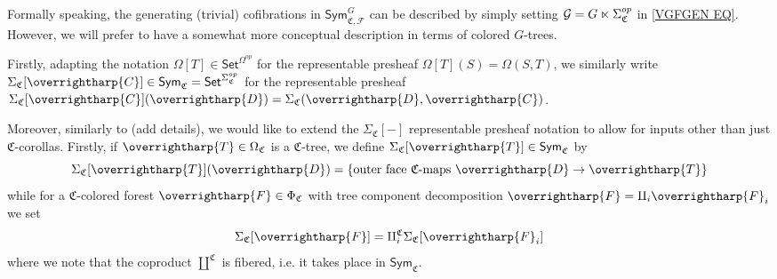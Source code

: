 \documentclass[a4paper,10pt
,draft
]{article}%
\renewcommand{\1}{\eta}%
\newcommand{\vect}[1]{\text{\overrightharp{\ensuremath{#1}}}}
\begin{document}
Formally speaking, the generating (trivial) cofibrations in 
$\mathsf{Sym}^G_{\mathfrak{C},\mathcal{F}}$
can be described by simply setting 
$\mathcal{G} = G \ltimes \Sigma^{op}_{\mathfrak{C}}$ in \eqref{VGFGEN EQ}.
However, we will prefer to have a somewhat more conceptual description in terms of colored $G$-trees.

Firstly, adapting the notation 
$\Omega[T] \in \mathsf{Set}^{\Omega^{op}}$
for the representable presheaf $\Omega[T](S) = \Omega(S,T)$,
we similarly write
$\Sigma_{\mathfrak{C}}[\vect{C}] 
\in \mathsf{Sym}_{\mathfrak{C}} = \mathsf{Set}^{\Sigma_{\mathfrak{C}}^{op}}$ for the representable presheaf
$\Sigma_{\mathfrak{C}}[\vect{C}](\vect{D})
= \Sigma_{\mathfrak{C}}(\vect{D},\vect{C})$.

Moreover, similarly to {\color{blue} \cite{BP_edss} (add details)},
we would like to extend the
$\Sigma_{\mathfrak{C}}[-]$ representable presheaf notation
to allow for inputs other than just $\mathfrak{C}$-corollas.
Firstly, if $\vect{T} \in \Omega_{\mathfrak{C}}$ is a $\mathfrak{C}$-tree, we define 
$\Sigma_{\mathfrak{C}}[\vect{T}] \in \mathsf{Sym}_{\mathfrak{C}}$
by
\[
\Sigma_{\mathfrak{C}}[\vect{T}](\vect{D})
=\{ \text{outer face $\mathfrak{C}$-maps } \vect{D} \to \vect{T}\}
\]
while for a $\mathfrak{C}$-colored forest
$\vect{F} \in \Phi_{\mathfrak{C}}$
with tree component decomposition
$\vect{F} = \amalg_i \vect{F}_i$
we set
\[
\Sigma_{\mathfrak{C}}[\vect{F}] =
\amalg^{\mathfrak{C}}_i 
\Sigma_{\mathfrak{C}}[\vect{F}_i]
\]
where we note that the coproduct $\amalg^{\mathfrak{C}}$ is fibered, i.e. it takes place in $\mathsf{Sym}_{\mathfrak{C}}$.
\end{document}
